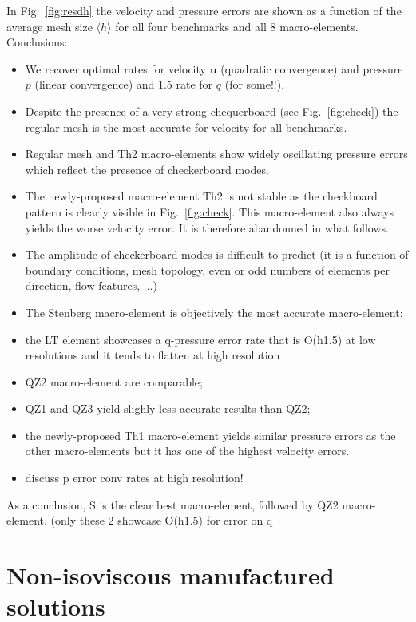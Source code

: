 \documentclass[a4paper]{article}
\begin{document}
In Fig.~\ref{fig:resdh} the velocity and pressure errors are shown as a function of the 
average mesh size $\langle h \rangle$ for all four benchmarks and all 8 macro-elements.
Conclusions:
\begin{itemize}
\item We recover optimal rates for velocity ${\bm u}$ (quadratic convergence) 
and pressure $p$ (linear convergence) and 1.5 rate for $q$ (for some!!).
\item Despite the presence of a very strong chequerboard (see Fig.~\ref{fig:check}) the regular mesh 
is the most accurate for velocity for all benchmarks.
\item Regular mesh and Th2 macro-elements show widely oscillating pressure errors which reflect the 
presence of checkerboard modes. 
\item The newly-proposed macro-element Th2 is not stable as the checkboard pattern is clearly visible in Fig.~\ref{fig:check}. 
This macro-element also always yields the worse velocity error. It is therefore abandonned in what follows. 
\item The amplitude of checkerboard modes is difficult to predict (it is a function 
of boundary conditions, mesh topology, even or odd numbers of elements per direction, flow features, ...) \cite{XXX} 
\item The Stenberg macro-element is objectively the most accurate macro-element; 
\item the LT element showcases a q-pressure error rate that is O(h1.5) at low resolutions and it tends to 
flatten at high resolution
\item  QZ2 macro-element are comparable; 
\item QZ1 and QZ3 yield slighly less accurate results than QZ2;
\item the newly-proposed Th1 macro-element yields similar pressure errors as the other macro-elements but 
it has one of the highest velocity errors.
\item discuss p error conv rates at high resolution!
\end{itemize}

As a conclusion, S is the clear best macro-element, followed by QZ2 macro-element.
(only these 2 showcase O(h1.5) for error on q


\section{Non-isoviscous manufactured solutions}
\end{document}

